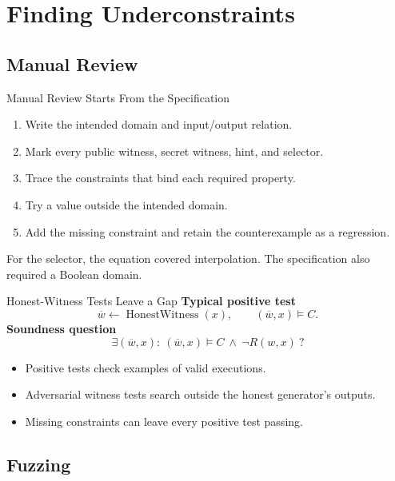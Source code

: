 \documentclass[aspectratio=169,11pt]{beamer}
\begin{document}
\section{Finding Underconstraints}

\subsection{Manual Review}

\begin{frame}{Manual Review Starts From the Specification}
\begin{enumerate}
\item Write the intended domain and input/output relation.
\item Mark every public witness, secret witness, hint, and selector.
\item Trace the constraints that bind each required property.
\item Try a value outside the intended domain.
\item Add the missing constraint and retain the counterexample as a regression.
\end{enumerate}
\vspace{3mm}For the selector, the equation covered interpolation. The specification also required a Boolean domain.
\end{frame}

\begin{frame}{Honest-Witness Tests Leave a Gap}
\textbf{Typical positive test}
\[\overline w\leftarrow\operatorname{HonestWitness}(x),\qquad (\overline w, x) \vDash C.\]
\textbf{Soundness question}
\[\exists (\overline w, x):\ (\overline w, x) \vDash C\ \land\ \neg R(w, x)\ ?\]
\begin{itemize}
\item Positive tests check examples of valid executions.
\item Adversarial witness tests search outside the honest generator's outputs.
\item Missing constraints can leave every positive test passing.
\end{itemize}
\end{frame}

\subsection{Fuzzing}
\end{document}
